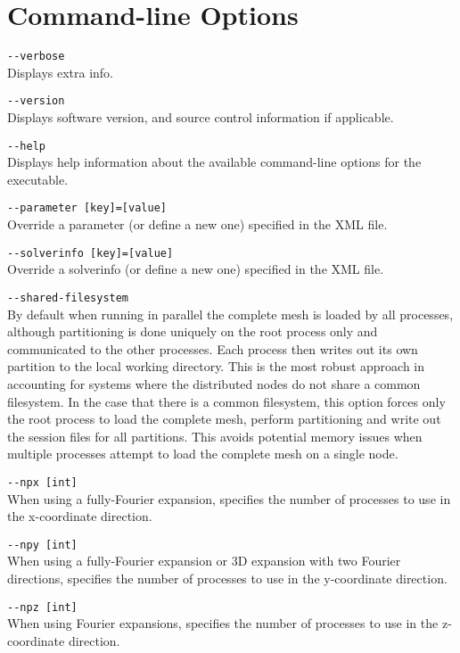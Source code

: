 \chapter{Command-line Options}

\lstinline[style=BashInputStyle]{--verbose}\\
\hangindent=1.5cm
Displays extra info.

\lstinline[style=BashInputStyle]{--version}\\
\hangindent=1.5cm
Displays software version, and source control information if applicable.

\lstinline[style=BashInputStyle]{--help}\\
\hangindent=1.5cm
Displays help information about the available command-line options for the executable.

\lstinline[style=BashInputStyle]{--parameter [key]=[value]}\\
\hangindent=1.5cm
Override a parameter (or define a new one) specified in the XML file.

\lstinline[style=BashInputStyle]{--solverinfo [key]=[value]}\\
\hangindent=1.5cm
Override a solverinfo (or define a new one) specified in the XML file.

\lstinline[style=BashInputStyle]{--shared-filesystem}\\
\hangindent=1.5cm
By default when running in parallel the complete mesh is loaded by all processes, although partitioning is done uniquely on the root process only and communicated to the other processes. Each process then writes out its own partition to the local working directory. This is the most robust approach in accounting for systems where the distributed nodes do not share a common filesystem. In the case that there is a common filesystem, this option forces only the root process to load the complete mesh, perform partitioning and write out the session files for all partitions. This avoids potential memory issues when multiple processes attempt to load the complete mesh on a single node.

\lstinline[style=BashInputStyle]{--npx [int]}\\
\hangindent=1.5cm
When using a fully-Fourier expansion, specifies the number of processes to use in the x-coordinate direction.

\lstinline[style=BashInputStyle]{--npy [int]}\\
\hangindent=1.5cm
\quad When using a fully-Fourier expansion or 3D expansion with two Fourier directions, specifies the number of processes to use in the y-coordinate direction.

\lstinline[style=BashInputStyle]{--npz [int]}\\
\hangindent=1.5cm
When using Fourier expansions, specifies the number of processes to use in the z-coordinate direction.
